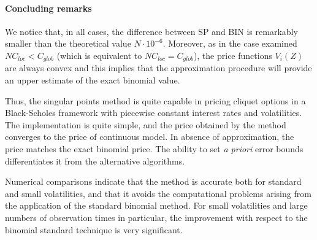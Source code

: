 \paragraph{Concluding remarks}
We notice that, in all cases, the difference between SP and BIN is remarkably smaller than the theoretical value $ N \cdot 10^{-6} $. Moreover, as in the case examined $ N C_{loc} < C_{glob} $ (which is equivalent to $ N C_{loc} = C_{glob} $), the price functions $ V_i(Z) $ are always convex and this implies that the approximation procedure will provide an upper estimate of the exact binomial value.

Thus, the singular points method is quite capable in pricing cliquet options in a Black-Scholes framework with piecewise constant interest rates and volatilities. The implementation is quite simple, and the price obtained by the method converges to the price of continuous model. In absence of approximation, the price matches the exact binomial price. The ability to set \emph{a priori} error bounds differentiates it from the alternative algorithms.

Numerical comparisons indicate that the method is accurate both for standard and small volatilities, and that it avoids the computational problems arising from the application of the standard binomial method. For small volatilities and large numbers of observation times in particular, the improvement with respect to the binomial standard technique is very significant.


